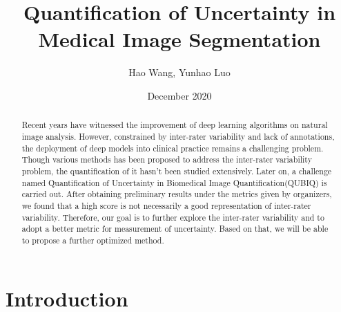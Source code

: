 \documentclass[12pt]{extarticle}
\title{Quantification of Uncertainty in Medical Image Segmentation}
\author{Hao Wang, Yunhao Luo}
\date{December 2020}
\begin{document}
\maketitle
\begin{abstract}
Recent years have witnessed the improvement of deep learning algorithms on natural image 
analysis. However, constrained by inter-rater variability and lack of annotations, 
the deployment of deep models into clinical practice remains a challenging problem. Though various methods
has been proposed to address the inter-rater variability problem, the quantification of it hasn't been 
studied extensively. Later on, a challenge named Quantification of Uncertainty in Biomedical Image Quantification(QUBIQ)
is carried out. After obtaining preliminary results under the metrics given by organizers, we found that a high score 
is not necessarily a good representation of inter-rater variability. Therefore, our goal is to 
further explore the inter-rater variability and to adopt a better metric for measurement of uncertainty. Based on that, we will be able to propose a further optimized method. 
\end{abstract}
\section{Introduction}
\end{document}
